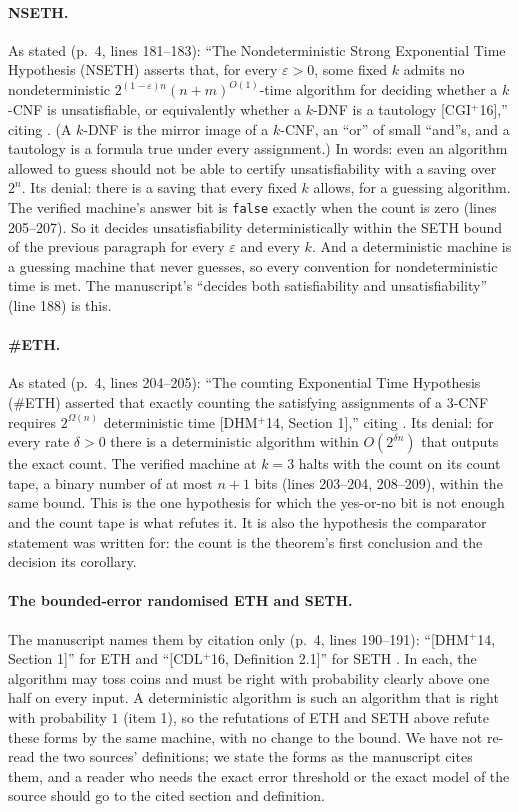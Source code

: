 \paragraph{NSETH.}
As stated (p.~4, lines 181--183): ``The Nondeterministic Strong
Exponential Time Hypothesis (NSETH) asserts that, for every
$\varepsilon > 0$, some fixed $k$ admits no nondeterministic
$2^{(1-\varepsilon)n}\allowbreak(n+m)^{O(1)}$-time algorithm for deciding whether a
$k$-CNF is unsatisfiable, or equivalently whether a $k$-DNF is a
tautology [CGI$^+$16],'' citing \citet{Carmosino2016}. (A $k$-DNF is the mirror image of a $k$-CNF, an ``or'' of small ``and''s, and a tautology is a formula true under every assignment.) In words: even an algorithm allowed to guess should not be able to certify
unsatisfiability with a saving over $2^n$. Its denial: there is a saving
that every fixed $k$ allows, for a guessing algorithm. The verified
machine's answer bit is \texttt{false} exactly when the count is zero
(lines 205--207). So it decides unsatisfiability deterministically within
the SETH bound of the previous paragraph for every $\varepsilon$ and
every $k$. And a deterministic machine is a guessing machine that never
guesses, so every convention for nondeterministic time is met. The
manuscript's ``decides both satisfiability and unsatisfiability'' (line
188) is this.

\paragraph{\#ETH.}
As stated (p.~4, lines 204--205): ``The counting Exponential Time
Hypothesis (\#ETH) asserted that exactly counting the satisfying
assignments of a 3-CNF requires $2^{\Omega(n)}$ deterministic time
[DHM$^+$14, Section 1],'' citing \citet{Dell2014}. Its denial: for every
rate $\delta > 0$ there is a deterministic algorithm within
$O(2^{\delta n})$ that outputs the exact count. The verified machine at
$k = 3$ halts with the count on its count tape, a binary number of at
most $n + 1$ bits (lines 203--204, 208--209), within the same bound. This
is the one hypothesis for which the yes-or-no bit is not enough and the
count tape is what refutes it. It is also the hypothesis the comparator
statement was written for: the count is the theorem's first conclusion
and the decision its corollary.

\paragraph{The bounded-error randomised ETH and SETH.}
The manuscript names them by citation only (p.~4, lines 190--191):
``[DHM$^+$14, Section 1]'' for ETH \citep{Dell2014} and ``[CDL$^+$16,
Definition 2.1]'' for SETH \citep{Cygan2016}. In each, the algorithm
may toss coins and must be right with probability clearly above one
half on every input. A deterministic algorithm is such an algorithm
that is right with probability $1$ (item 1), so the refutations of ETH
and SETH above refute these forms by the same machine, with no change
to the bound. We have not re-read the two sources' definitions; we
state the forms as the manuscript cites them, and a reader who needs the
exact error threshold or the exact model of the source should go to the
cited section and definition.

